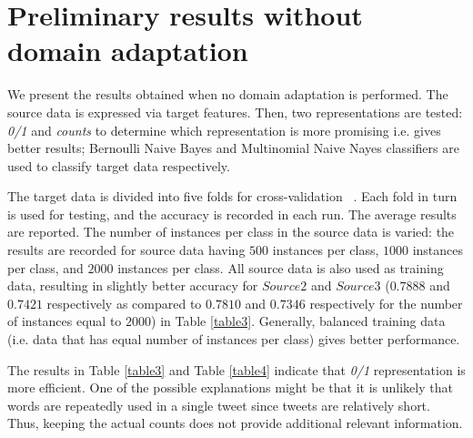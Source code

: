 \section{Preliminary results without domain adaptation}
\label{preresults}

We present the results obtained when no domain adaptation is performed. The source data is expressed via target features. Then, two representations are tested: \textit{0/1} and \textit{counts} to determine which representation is more promising i.e. gives better results; Bernoulli Naive Bayes and Multinomial Naive Nayes classifiers are used to classify target data respectively. 

The target data is divided into five folds for cross-validation ~\citep{hastie}. Each fold in turn is used for testing, and the accuracy is recorded in each run. The average results are reported. The number of instances per class in the source data is varied: the results are recorded for source data having $500$ instances per class, $1000$ instances per class, and $2000$ instances per class. All source data is also used as training data, resulting in slightly better accuracy for $Source 2$ and $Source  3$ ($0.7888$ and $0.7421$ respectively as compared to $0.7810$ and $0.7346$ respectively for the number of instances equal to $2000$) in Table \ref{table3}. Generally, balanced training data (i.e. data that has equal number of instances per class) gives better performance.

The results in Table \ref{table3} and Table \ref{table4} indicate that \textit{0/1} representation is more efficient. One of the possible explanations might be that it is unlikely that words are repeatedly used in a single tweet since tweets are relatively short. Thus, keeping the actual counts does not provide additional relevant information.


